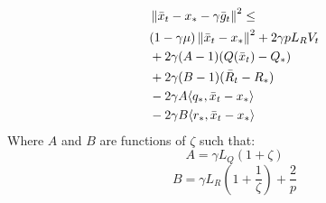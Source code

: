 \begin{lemma}\label{lem:AB-lemma}
    \begin{align}
    \begin{split}
        &\left\|\bar{x}_t - x_* - \gamma \bar{g}_t\right\|^2 \leq \\
        &(1 - \gamma \mu)\left\|\bar{x}_t - x_*\right\|^2 + 2 \gamma p L_R V_t \\
        &+ 2\gamma (A - 1)(Q(\bar{x}_t) - Q_*) \\
        &+ 2\gamma (B - 1)(\bar{R}_t - R_*) \\
        &- 2\gamma A \langle q_*, \bar{x}_t - x_*\rangle \\
        &- 2\gamma B \langle r_*, \bar{x}_t - x_*\rangle
    \end{split}
\end{align}
Where $A$ and $B$ are functions of $\zeta$ such that:
\[A = \gamma L_Q(1+\zeta)\] \[B = \gamma L_R(1+\frac{1}{\zeta}) + \frac{2}{p}\]

\end{lemma}
